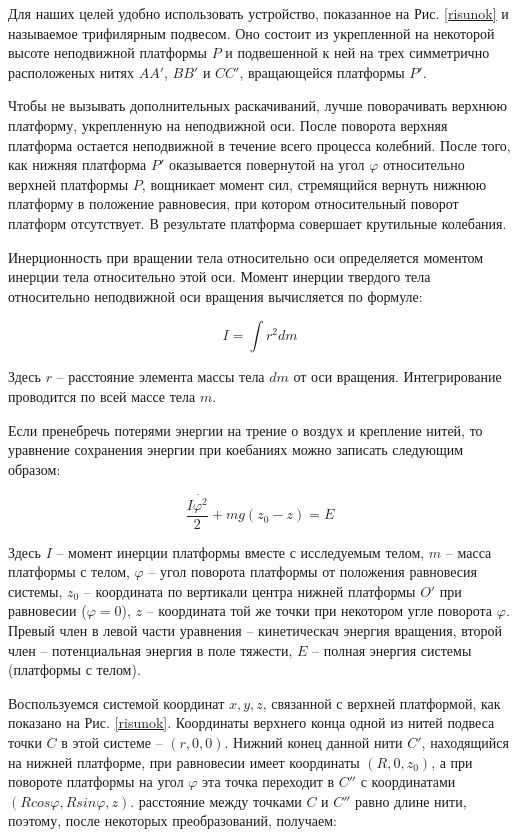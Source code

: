 \documentclass[a4paper]{article}
\begin{document}
	Для наших целей удобно использовать устройство, показанное на Рис. \ref{risunok} и называемое трифилярным подвесом. Оно состоит из укрепленной на некоторой высоте неподвижной платформы $P$ и подвешенной к ней на трех симметрично расположеных нитях $AA'$, $BB'$ и $CC'$, вращающейся платформы $P'$. 
	
	Чтобы не вызывать дополнительных раскачиваний, лучше поворачивать верхнюю платформу, укрепленную на неподвижной оси. После поворота верхняя платформа остается неподвижной в течение всего процесса колебний. После того, как нижняя платформа $P'$ оказывается повернутой на угол $\varphi$ относительно верхней платформы $P$, вощникает момент сил, стремящийся вернуть нижнюю платформу в положение равновесия, при котором относительный поворот платформ отсутствует. В результате платформа совершает крутильные колебания.
	
	
	\par Инерционность при вращении тела относительно оси определяется моментом инерции тела относительно этой оси. Момент инерции твердого тела относительно неподвижной оси вращения вычисляется по формуле:
	
	\begin{equation}
		I = \int r^2 dm
	\end{equation}
	
	Здесь $r$ -- расстояние элемента массы тела $dm$ от оси вращения. Интегрирование проводится по всей массе тела $m$.
	
	Если пренебречь потерями энергии на трение о воздух и крепление нитей, то уравнение сохранения энергии при коебаниях можно записать следующим образом:
	
	\begin{equation}\label{moment}
		\frac{I \dot{\varphi^2}}{2} + mg(z_0-z) = E
	\end{equation}
	
	Здесь $I$ -- момент инерции платформы вместе с исследуемым телом, $m$ -- масса платформы с телом, $\varphi$ -- угол поворота платформы от положения равновесия системы, $z_0$ -- координата по вертикали центра нижней платформы $O'$  при равновесии ($\varphi = 0$), $z$ -- координата той же точки при некотором угле поворота $\varphi$. Превый член в левой части уравнения -- кинетическач энергия вращения, второй член -- потенциальная энергия в поле тяжести, $E$ -- полная энергия системы (платформы с телом).
	
	Воспользуемся системой координат $x, y, z$, связанной с верхней платформой, как показано на Рис. \ref{risunok}. Координаты верхнего конца одной из нитей подвеса точки $C$ в этой системе -- $(r, 0, 0)$. Нижний конец данной нити $C'$, находящийся на нижней платформе, при равновесии имеет координаты $(R, 0, z_0)$, а при повороте платформы на угол $\varphi$ эта точка переходит в $C''$ с координатами $(Rcos\varphi, Rsin\varphi, z)$. расстояние между точками $C$ и $C''$ равно длине нити, поэтому, после некоторых преобразований, получаем: 
	
\end{document}
